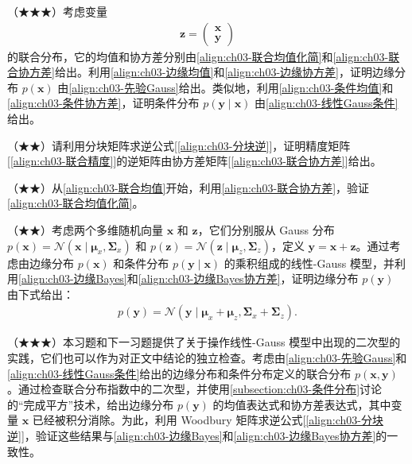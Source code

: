 \documentclass[../../main.tex]{subfiles}
\begin{document}
\begin{exercise}\label{exercise:ch03-22}
（★★★）考虑变量
\begin{align*}
\boldsymbol{z}=\begin{pmatrix}\boldsymbol{x}\\ \boldsymbol{y}\end{pmatrix}
\end{align*}
的联合分布，它的均值和协方差分别由\eqref{align:ch03-联合均值化简}和\eqref{align:ch03-联合协方差}给出。利用\eqref{align:ch03-边缘均值}和\eqref{align:ch03-边缘协方差}，证明边缘分布 $p(\boldsymbol{x})$ 由\eqref{align:ch03-先验Gauss}给出。类似地，利用\eqref{align:ch03-条件均值}和\eqref{align:ch03-条件协方差}，证明条件分布 $p(\boldsymbol{y}\mid\boldsymbol{x})$ 由\eqref{align:ch03-线性Gauss条件}给出。
\end{exercise}

\begin{exercise}\label{exercise:ch03-23}
（★★）请利用分块矩阵求逆公式[\eqref{align:ch03-分块逆}]，证明精度矩阵[\eqref{align:ch03-联合精度}]的逆矩阵由协方差矩阵[\eqref{align:ch03-联合协方差}]给出。
\end{exercise}

\begin{exercise}\label{exercise:ch03-24}
（★★）从\eqref{align:ch03-联合均值}开始，利用\eqref{align:ch03-联合协方差}，验证\eqref{align:ch03-联合均值化简}。
\end{exercise}

\begin{exercise}\label{exercise:ch03-25}
（★★）考虑两个多维随机向量 $\boldsymbol{x}$ 和 $\boldsymbol{z}$，它们分别服从 Gauss 分布 $p(\boldsymbol{x})=\mathcal{N}(\boldsymbol{x}\mid\boldsymbol{\mu}_{x},\boldsymbol{\Sigma}_{x})$ 和 $p(\boldsymbol{z})=\mathcal{N}(\boldsymbol{z}\mid\boldsymbol{\mu}_{z},\boldsymbol{\Sigma}_{z})$，定义 $\boldsymbol{y}=\boldsymbol{x}+\boldsymbol{z}$。通过考虑由边缘分布 $p(\boldsymbol{x})$ 和条件分布 $p(\boldsymbol{y}\mid\boldsymbol{x})$ 的乘积组成的线性-Gauss 模型，并利用\eqref{align:ch03-边缘Bayes}和\eqref{align:ch03-边缘Bayes协方差}，证明边缘分布 $p(\boldsymbol{y})$ 由下式给出：
\begin{align*}
p(\boldsymbol{y})=\mathcal{N}(\boldsymbol{y}\mid\boldsymbol{\mu}_{x}+\boldsymbol{\mu}_{z},\boldsymbol{\Sigma}_{x}+\boldsymbol{\Sigma}_{z}).
\end{align*}
\end{exercise}

\begin{exercise}\label{exercise:ch03-26}
（★★★）本习题和下一习题提供了关于操作线性-Gauss 模型中出现的二次型的实践，它们也可以作为对正文中结论的独立检查。考虑由\eqref{align:ch03-先验Gauss}和\eqref{align:ch03-线性Gauss条件}给出的边缘分布和条件分布定义的联合分布 $p(\boldsymbol{x},\boldsymbol{y})$。通过检查联合分布指数中的二次型，并使用\cref{subsection:ch03-条件分布}讨论的“完成平方”技术，给出边缘分布 $p(\boldsymbol{y})$ 的均值表达式和协方差表达式，其中变量 $\boldsymbol{x}$ 已经被积分消除。为此，利用 Woodbury 矩阵求逆公式[\eqref{align:ch03-分块逆}]，验证这些结果与\eqref{align:ch03-边缘Bayes}和\eqref{align:ch03-边缘Bayes协方差}的一致性。
\end{exercise}
\end{document}
